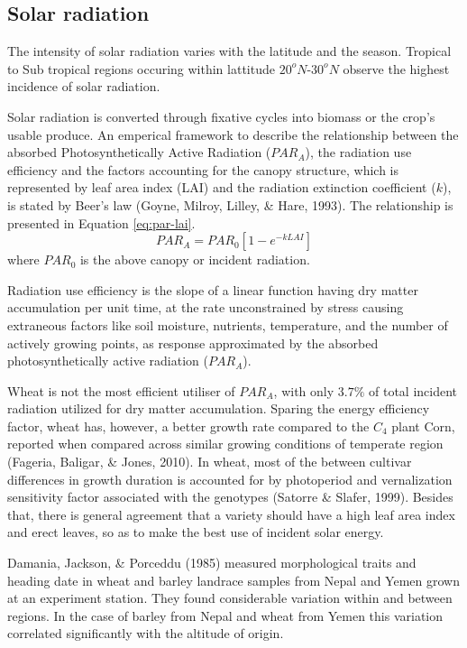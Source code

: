 \documentclass[12pt,oneside]{dukestatscithesis} %
\theoremstyle{definition}
\theoremstyle{definition}
\theoremstyle{definition}
\theoremstyle{remark}
\begin{document}
\subsection{Solar radiation}\label{solar-radiation}

The intensity of solar radiation varies with the latitude and the
season. Tropical to Sub tropical regions occuring within lattitude
\(20^oN\)-\(30^oN\) observe the highest incidence of solar radiation.

Solar radiation is converted through fixative cycles into biomass or the
crop's usable produce. An emperical framework to describe the
relationship between the absorbed Photosynthetically Active Radiation
(\(PAR_A\)), the radiation use efficiency and the factors accounting for
the canopy structure, which is represented by leaf area index (LAI) and
the radiation extinction coefficient (\(\textit{k}\)), is stated by
Beer's law (Goyne, Milroy, Lilley, \& Hare, 1993). The relationship is
presented in Equation \eqref{eq:par-lai}.
\begin{equation}
PAR_A = PAR_0[1-e^{-\textit{k}LAI}]
\label{eq:par-lai}
\end{equation}
where \(PAR_0\) is the above canopy or incident radiation.

Radiation use efficiency is the slope of a linear function having dry
matter accumulation per unit time, at the rate unconstrained by stress
causing extraneous factors like soil moisture, nutrients, temperature,
and the number of actively growing points, as response approximated by
the absorbed photosynthetically active radiation (\(PAR_A\)).

Wheat is not the most efficient utiliser of \(PAR_A\), with only
\(3.7\%\) of total incident radiation utilized for dry matter
accumulation. Sparing the energy efficiency factor, wheat has, however,
a better growth rate compared to the \(C_4\) plant Corn, reported when
compared across similar growing conditions of temperate region (Fageria,
Baligar, \& Jones, 2010). In wheat, most of the between cultivar
differences in growth duration is accounted for by photoperiod and
vernalization sensitivity factor associated with the genotypes (Satorre
\& Slafer, 1999). Besides that, there is general agreement that a
variety should have a high leaf area index and erect leaves, so as to
make the best use of incident solar energy.

Damania, Jackson, \& Porceddu (1985) measured morphological traits and
heading date in wheat and barley landrace samples from Nepal and Yemen
grown at an experiment station. They found considerable variation within
and between regions. In the case of barley from Nepal and wheat from
Yemen this variation correlated significantly with the altitude of
origin.
\end{document}
